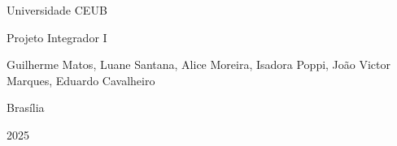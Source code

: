 
\begin{titlepage}
    \centering
    \vspace*{5cm}
    {\Large Universidade CEUB \par}
    {\large Projeto Integrador I \par}
    \vfill
    {\large Guilherme Matos, Luane Santana, Alice Moreira,
    Isadora Poppi, João Victor Marques, Eduardo Cavalheiro \par}
    {\large Brasília \par}
    {\large 2025 \par}
\end{titlepage}
